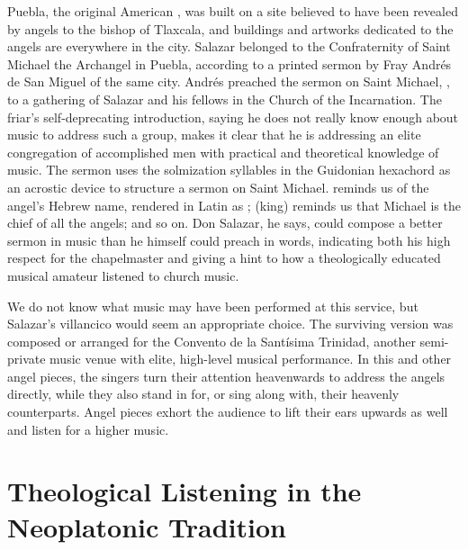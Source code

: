 Puebla, the original American , was built on a site
believed to have been revealed by angels to the bishop of Tlaxcala, and
buildings and artworks dedicated to the angels are everywhere in the city.
Salazar belonged to the Confraternity of Saint Michael the Archangel in Puebla,
according to a printed sermon by Fray Andrés de San Miguel of the same city.
Andrés preached the sermon on Saint Michael, , to a gathering of Salazar and his fellows in the Church
of the Incarnation.%
    \Autocite[65--95]{SanMiguel:Sermones} %
The friar's self-deprecating introduction, saying he does not really know enough
about music to address such a group, makes it clear that he is addressing an
elite congregation of accomplished men with practical and theoretical knowledge
of music.
The sermon uses the solmization syllables in the Guidonian hexachord as an
acrostic device to structure a sermon on Saint Michael.
 reminds us of the angel's Hebrew name, rendered in Latin as
;  (king) reminds us that Michael is the chief
of all the angels; and so on.
Don Salazar, he says, could compose a better sermon in music than he himself
could preach in words, indicating both his high respect for the chapelmaster
and giving a hint to how a theologically educated musical amateur listened to
church music.

We do not know what music may have been performed at this service, but
Salazar's villancico  would seem an appropriate choice.
The surviving version was composed or arranged for the Convento de la Santísima
Trinidad, another semi-private music venue with elite, high-level musical
performance.
In this and other angel pieces, the singers turn their attention heavenwards to
address the angels directly, while they also stand in for, or sing along
with, their heavenly counterparts.
Angel pieces exhort the audience to lift their ears upwards as well and listen
for a higher music.

\section{Theological Listening in the Neoplatonic Tradition}

